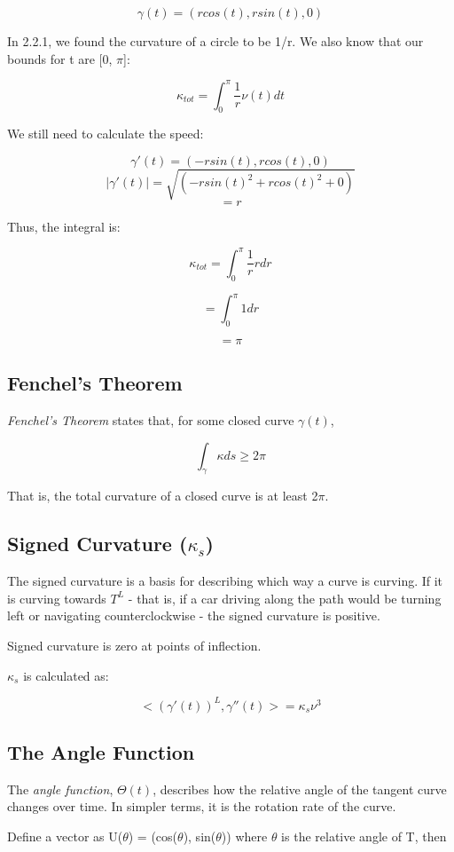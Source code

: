 \documentclass{article}
\begin{document}
\[ \gamma(t) = (rcos(t), rsin(t), 0) \]

In 2.2.1, we found the curvature of a circle to be 1/r. We also know that our bounds for t are [0, $\pi$]:

\[\kappa_{tot} = \int_{0}^{\pi} \frac{1}{r} \nu(t) dt\] 

We still need to calculate the speed:

\[ \gamma'(t) = (-rsin(t), rcos(t), 0) \]
\[ |\gamma'(t)| = \sqrt{(-rsin(t)^2 + rcos(t)^2 + 0)} \]
\[ = r \]

Thus, the integral is:

\[\kappa_{tot} = \int_{0}^{\pi} \frac{1}{r} r dr\] 

\[= \int_{0}^{\pi} 1 dr\] 

\[ = \pi \]

\subsection{Fenchel's Theorem}

{\it{Fenchel's Theorem}} states that, for some closed curve $\gamma(t)$,

\[ \int_{\gamma}\kappa ds \geq 2\pi \]

That is, the total curvature of a closed curve is at least 2$\pi$.

\subsection{Signed Curvature ($\kappa_{s}$)}

The signed curvature is a basis for describing which way a curve is curving. If it is curving towards $T^L$ - that is, if a car driving along the path would be turning left or navigating counterclockwise - the signed curvature is positive. 

Signed curvature is zero at points of inflection.

$\kappa_{s}$ is calculated as:

\[<(\gamma'(t))^L,\gamma''(t)> = \kappa_{s}\nu^3\]

\subsection{The Angle Function}
The {\it{angle function}}, $\Theta(t)$, describes how the relative angle of the tangent curve changes over time. In simpler terms, it is the rotation rate of the curve.

Define a vector as U($\theta$) = (cos($\theta$), sin($\theta$)) where $\theta$ is the relative angle of T, then
\end{document}
